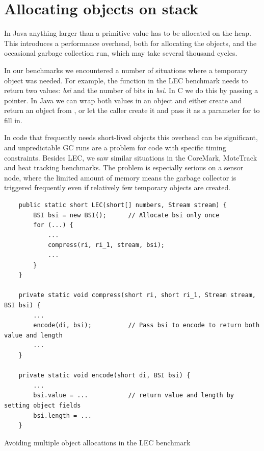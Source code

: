 \section{Allocating objects on stack}
\label{sec-no-gc}
In Java anything larger than a primitive value has to be allocated on the heap. This introduces a performance overhead, both for allocating the objects, and the occasional garbage collection run, which may take several thousand cycles.

In our benchmarks we encountered a number of situations where a temporary object was needed. For example, the  function in the LEC benchmark needs to return two values: \emph{bsi} and the number of bits in \emph{bsi}. In C we do this by passing a pointer. In Java we can wrap both values in an object and either create and return an object from , or let the caller create it and pass it as a parameter for  to fill in.

In code that frequently needs short-lived objects this overhead can be significant, and unpredictable GC runs are a problem for code with specific timing constraints. Besides LEC, we saw similar situations in the CoreMark, MoteTrack and heat tracking benchmarks. The problem is especially serious on a sensor node, where the limited amount of memory means the garbage collector is triggered frequently even if relatively few temporary objects are created.

\begin{listing}[]
	\centering
	\begin{verbatim}
    public static short LEC(short[] numbers, Stream stream) {
        BSI bsi = new BSI();      // Allocate bsi only once
        for (...) {
            ...
            compress(ri, ri_1, stream, bsi);
            ...
        }
    }

    private static void compress(short ri, short ri_1, Stream stream, BSI bsi) {
        ...
        encode(di, bsi);          // Pass bsi to encode to return both value and length
        ...
    }

    private static void encode(short di, BSI bsi) {
        ...
        bsi.value = ...           // return value and length by setting object fields
        bsi.length = ...
    }
	\end{verbatim}
\caption{Avoiding multiple object allocations in the LEC benchmark}
\label{lst-lec-avoiding-object-allocations}
\end{listing}

